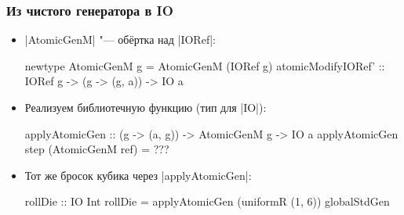 \documentclass[11pt]{beamer}
\begin{document}
\begin{frame}[fragile]
  \frametitle{Из чистого генератора в IO}
  \begin{itemize}
    \item \haskinline|AtomicGenM| "--- обёртка над \haskinline|IORef|:
          \begin{haskellsmall}
            newtype AtomicGenM g = AtomicGenM (IORef g)
            atomicModifyIORef' :: IORef g -> (g -> (g, a)) -> IO a
          \end{haskellsmall}
    \item Реализуем библиотечную функцию (тип для \haskinline|IO|):
          \begin{overprint}[\linewidth]
              \begin{haskellsmall}
                applyAtomicGen :: (g -> (a, g)) -> AtomicGenM g -> IO a
                applyAtomicGen step (AtomicGenM ref) = ???
              \end{haskellsmall}
          \end{overprint}
          \pause
    \item Тот же бросок кубика через \haskinline|applyAtomicGen|:
          \begin{haskellsmall}
            rollDie :: IO Int
            rollDie = applyAtomicGen (uniformR (1, 6)) globalStdGen
          \end{haskellsmall}
  \end{itemize}
\end{frame}
\end{document}
